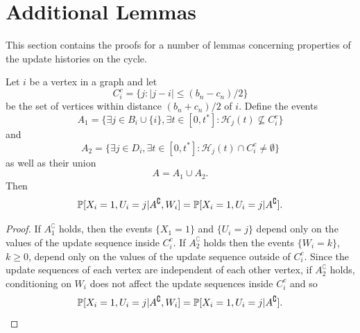 	\section{Additional Lemmas}
	\label{sec:additional lemmas 1D}
	This section contains the proofs for a number of lemmas concerning properties of the update histories on the cycle.

	\begin{lemma}
	\label{lem:conditioning on A removes conditioning on W}
		Let $i$ be a vertex in a graph and let
		\begin{equation}
			C_i^c = \{j : |j - i| \leq (b_n - c_n)/2\}
		\end{equation}
		be the set of vertices within distance $(b_n + c_n)/2$ of $i$. Define the events
		\begin{equation}
			A_1 = \{\exists j \in B_i \cup \{i\}, \exists t \in [0, t^*] : \mathcal{H}_j(t) \nsubseteq  C_i^c\}
		\end{equation}
		and
		\begin{equation}
			A_2 = \{\exists j \in D_i, \exists t \in [0, t^*] : \mathcal{H}_j(t) \cap C_i^c \neq \emptyset\}
		\end{equation}
		as well as their union
		\begin{equation}
			A = A_1 \cup A_2.
		\end{equation}
		Then
		\begin{equation}
			\mathbb{P}[X_i = 1, U_i = j | A^\complement, W_i] = \mathbb{P}[X_i = 1, U_i = j | A^\complement].
		\end{equation}
	\end{lemma}
	\begin{proof}
		If $A_1^\complement$ holds, then the events $\{X_1 = 1\}$ and $\{U_i = j\}$ depend only on the values of the update sequence inside $C_i^c$. If $A_2^\complement$ holds then the events $\{W_i = k\}$, $k \geq 0$, depend only on the values of the update sequence outside of $C_i^c$. Since the update sequences of each vertex are independent of each other vertex, if $A_2^\complement$ holds, conditioning on $W_i$ does not affect the update sequences inside $C_i^c$ and so 
		\begin{equation}
			\mathbb{P}[X_i = 1, U_i = j | A^\complement, W_i] = \mathbb{P}[X_i = 1, U_i = j | A^\complement].
		\end{equation}
	\end{proof}

